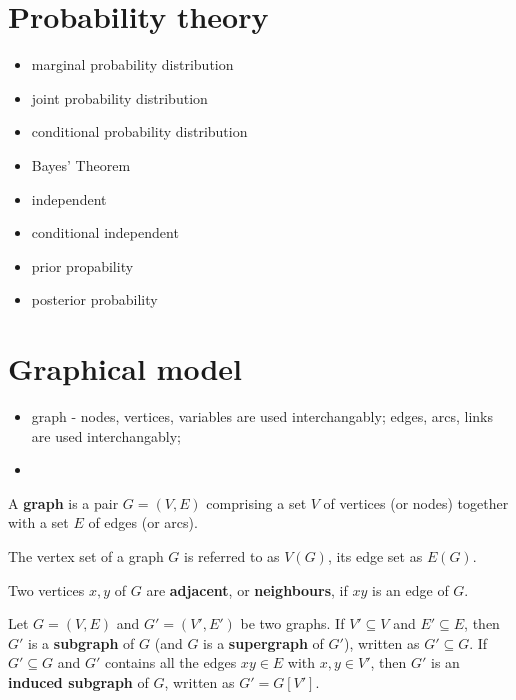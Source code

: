 \section{Probability theory}
\begin{itemize}
\item marginal probability distribution
\item joint probability distribution
\item conditional probability distribution
\item Bayes' Theorem
\item independent
\item conditional independent
\item prior propability
\item posterior probability
\end{itemize}

\section{Graphical model}
\begin{itemize}
\item graph - nodes, vertices, variables are used interchangably; edges, arcs, links are used interchangably;
\item 
\end{itemize}

\begin{definition}
\label{def:graph}
A \textbf{graph} is a pair $G = (V, E)$ comprising a set $V$ of vertices (or nodes) together with a set $E$ of edges (or arcs).
\end{definition}
The vertex set of a graph $G$ is referred to as $V(G)$, its edge set as $E(G)$. 

\begin{definition}
\label{def:neighbour}
Two vertices $x, y$ of $G$ are \textbf{adjacent}, or \textbf{neighbours}, if $xy$ is an edge of $G$. 
\end{definition}

\begin{definition}
\label{def:subgraph}
Let $G=(V,E)$ and $G'=(V',E')$ be two graphs. If $V' \subseteq V$ and $E' \subseteq E$, then $G'$ is a \textbf{subgraph} of $G$ (and $G$ is a \textbf{supergraph} of $G'$), written as $G' \subseteq G$. If $G' \subseteq G$ and $G'$ contains all the edges $xy \in E$ with $x, y \in V'$, then $G'$ is an \textbf{induced subgraph} of $G$, written as $G' = G[V']$. 
\end{definition}


